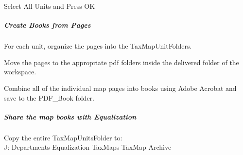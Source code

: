 Select All Units and Press OK
\clearpage
\subparagraph{Create Books from Pages}

For each unit, organize the pages into the TaxMapUnitFolders.

\noindent Move the pages to the appropriate pdf folders inside the delivered folder of the workspace. 

\noindent Combine all of the individual map pages into books using Adobe Acrobat and save to the PDF\_Book folder. 
  
\subparagraph{Share the map books with Equalization}

Copy the entire TaxMapUnitsFolder to:\\
J: {\menuArrow} Departments {\menuArrow} Equalization {\menuArrow} TaxMaps {\menuArrow} TaxMap Archive


